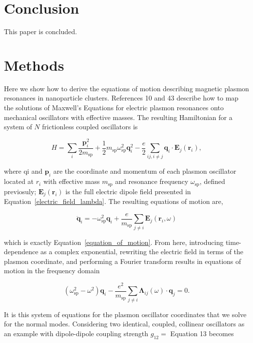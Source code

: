 \documentclass[journal=apchd5,manuscript=article]{achemso}
\begin{document}
\section{Conclusion}
This paper is concluded.

\section{Methods}
Here we show how to derive the equations of motion describing magnetic plasmon resonances in nanoparticle clusters. References 10 and 43 describe how to map the solutions of Maxwell's Equations for electric plasmon resonances onto mechanical oscillators with effective masses. The resulting Hamiltonian for a system of $N$ frictionless coupled oscillators is

\begin{equation}
H = \sum_{i}\frac{\textbf{p}_i^2}{2m_{\textrm{sp}}}+\frac{1}{2}m_{\textrm{sp}}\omega_{\textrm{sp}}^2\textbf{q}_i^2 - \frac{e}{2}\sum_{ij,i\neq j}\textbf{q}_i\cdot\textbf{E}_j(\textbf{r}_i),
\label{hammy}
\end{equation}

\noindent where qi and $\textbf{p}_i$ are the coordinate and momentum of each plasmon oscillator located at $r_i$ with effective mass $m_{\textrm{sp}}$ and resonance frequency $\omega_{\textrm{sp}}$, defined previosuly; $\textbf{E}_j(\textbf{r}_i)$ is the full electric dipole field presented in Equation~\ref{electric_field_lambda}. The resulting equations of motion are,

\begin{equation}
\ddot{\textbf{q}}_i = -\omega_{\textrm{sp}}^2\textbf{q}_i + \frac{e}{m_{\textrm{sp}}}\sum_{j\neq i}\textbf{E}_j(\textbf{r}_i,\omega)
\label{equation_of_motion_again}
\end{equation}

\noindent which is exactly Equation~\ref{equation_of_motion}. From here, introducing time-dependence as a complex exponential, rewriting the electric field in terms of the plasmon coordinate, and performing a Fourier transform results in equations of motion in the frequency domain

\begin{equation}
(\omega_{\textrm{sp}}^2-\omega^2)\textbf{q}_i -\frac{e^2}{m_\textrm{sp}}\sum_{j\neq i}\boldsymbol{\Lambda}_{ij}(\omega)\cdot\textbf{q}_j = 0.
\label{fourier_eom}
\end{equation}

It is this system of equations for the plasmon oscillator coordinates that we solve for the normal modes. Considering two identical, coupled, collinear oscillators as an example with dipole-dipole coupling strength $g_{12} = $ Equation 13 becomes
\end{document}
